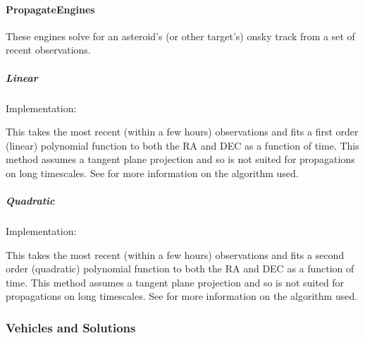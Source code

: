 \documentclass[letterpaper,11pt,english]{sphinxmanual}
\begin{document}
\paragraph{PropagateEngines}
\label{\detokenize{technical/architecture/services_engines:propagateengines}}\label{\detokenize{technical/architecture/services_engines:technical-architecture-services-engines-propagateengines}}
\sphinxAtStartPar
These engines solve for an asteroid’s (or other target’s) on\sphinxhyphen{}sky track from a
set of recent observations.


\subparagraph{Linear}
\label{\detokenize{technical/architecture/services_engines:linear}}
\sphinxAtStartPar
Implementation: {\hyperref[\detokenize{code/opihiexarata.propagate.polynomial:opihiexarata.propagate.polynomial.LinearPropagationEngine}]{}}

\sphinxAtStartPar
This takes the most recent (within a few hours) observations and fits a
first order (linear) polynomial function to both the RA and DEC as a function
of time. This method assumes a tangent plane projection and so is not suited
for propagations on long timescales. See
{\hyperref[\detokenize{technical/algorithms/polynomial_propagation:technical-algorithms-polynomial-propagation}]{}} for more information on the
algorithm used.


\subparagraph{Quadratic}
\label{\detokenize{technical/architecture/services_engines:quadratic}}
\sphinxAtStartPar
Implementation: {\hyperref[\detokenize{code/opihiexarata.propagate.polynomial:opihiexarata.propagate.polynomial.QuadraticPropagationEngine}]{}}

\sphinxAtStartPar
This takes the most recent (within a few hours) observations and fits a
second order (quadratic) polynomial function to both the RA and DEC as a
function of time. This method assumes a tangent plane projection and so is not
suited for propagations on long timescales. See
{\hyperref[\detokenize{technical/algorithms/polynomial_propagation:technical-algorithms-polynomial-propagation}]{}} for more information on the
algorithm used.

\sphinxstepscope


\subsubsection{Vehicles and Solutions}
\label{\detokenize{technical/architecture/vehicles_solutions:vehicles-and-solutions}}\label{\detokenize{technical/architecture/vehicles_solutions:technical-architecture-vehicles-solutions}}\label{\detokenize{technical/architecture/vehicles_solutions::doc}}
\sphinxstepscope
\end{document}
